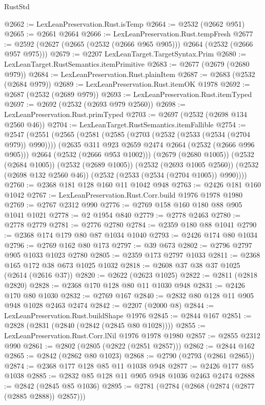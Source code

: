 \begin{lexlean}{RustStd}
\begin{coremodule}
@2662 := LexLeanPreservation.Rust.isTemp
@2664 := @2532 (@2662 @951)
@2665 := @2661 @2664
@2666 := LexLeanPreservation.Rust.tempFresh
@2677 := @2592 (@2627 (@2665 (@2532 (@2666 @965 @905))) @2664 (@2532 (@2666 @957 @975)))
@2679 := @2207 LexLeanTarget.TargetSyntax.Prim
@2680 := LexLeanTarget.RustSemantics.itemPrimitive
@2683 := @2677 (@2679 (@2680 @979))
@2684 := LexLeanPreservation.Rust.plainItem
@2687 := @2683 (@2532 (@2684 @979))
@2689 := LexLeanPreservation.Rust.itemOK @1978
@2692 := @2687 (@2532 (@2689 @979))
@2693 := LexLeanPreservation.Rust.itemTyped
@2697 := @2692 (@2532 (@2693 @979 @2560))
@2698 := LexLeanPreservation.Rust.primTyped
@2703 := @2697 (@2532 (@2698 @134 @2560 @46))
@2704 := LexLeanTarget.RustSemantics.itemFallible
@2754 := @2547
    (@2551
      (@2565
        (@2581
          (@2585 (@2703 (@2532 (@2533 (@2534 (@2704 @979)) @990))))
          (@2635 @311 @923 @2659 @2474 @2664 (@2532 (@2666 @996 @905)))
          @2664
          (@2532 (@2666 @953 @1002)))
        (@2679 (@2680 @1005))
        (@2532 (@2684 @1005))
        (@2532 (@2689 @1005))
        (@2532 (@2693 @1005 @2560))
        (@2532 (@2698 @132 @2560 @46))
        (@2532 (@2533 (@2534 (@2704 @1005)) @990))))
@2760 := @2368 @181 @128 @160 @11 @1042 @948
@2763 := @2426 @181 @160 @1042
@2767 := LexLeanPreservation.Rust.Corr.build @1976 @1978 @1980
@2769 := @2767 @2312 @990
@2776 := @2769 @158 @160 @180 @88 @905 @1041 @1021
@2778 := @2 @1954 @840
@2779 := @2778 @2463
@2780 := @2778 @2779
@2781 := @2776 @2780
@2784 := @2359 @180 @88 @1041
@2790 := @2368 @174 @179 @80 @87 @1034 @1040
@2793 := @2426 @174 @80 @1034
@2796 := @2769 @162 @80 @173
@2797 := @39 @673
@2802 := @2796 @2797 @905 @1033 @1023 @2780
@2805 := @2359 @173 @2797 @1033
@2811 := @2368 @165 @172 @38 @673 @1025 @1032
@2818 := @2608 @37 @38 @37 @1025 (@2614 (@2616 @37))
@2820 := @2622 (@2623 @1025)
@2822 := @2811 (@2818 @2820)
@2828 := @2368 @170 @128 @80 @11 @1030 @948
@2831 := @2426 @170 @80 @1030
@2832 := @2769 @167
@2840 := @2832 @80 @128 @11 @905 @948 @1028 @2463 @2474
@2842 := @2207 (@2000 @8)
@2844 := LexLeanPreservation.Rust.buildShape @1976
@2845 := @2844 @167
@2851 := @2828 (@2831 (@2840 (@2842 (@2845 @80 @1028))))
@2855 := LexLeanPreservation.Rust.Corr.lNil @1976 @1978 @1980
@2857 := @2855 @2312 @990
@2861 := @2802 (@2805 (@2822 (@2851 @2857)))
@2862 := @2844 @162
@2865 := @2842 (@2862 @80 @1023)
@2868 := @2790 (@2793 (@2861 @2865))
@2874 := @2368 @177 @128 @85 @11 @1038 @948
@2877 := @2426 @177 @85 @1038
@2885 := @2832 @85 @128 @11 @905 @948 @1036 @2463 @2474
@2888 := @2842 (@2845 @85 @1036)
@2895 := @2781 (@2784 (@2868 (@2874 (@2877 (@2885 @2888)) @2857)))

\end{coremodule}
\end{lexlean}

